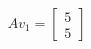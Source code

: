 \documentclass{article}
\begin{document}
\begin{align*}
Av_1 = \begin{bmatrix}5\\5\end{bmatrix}
\end{align*}
\end{document}
